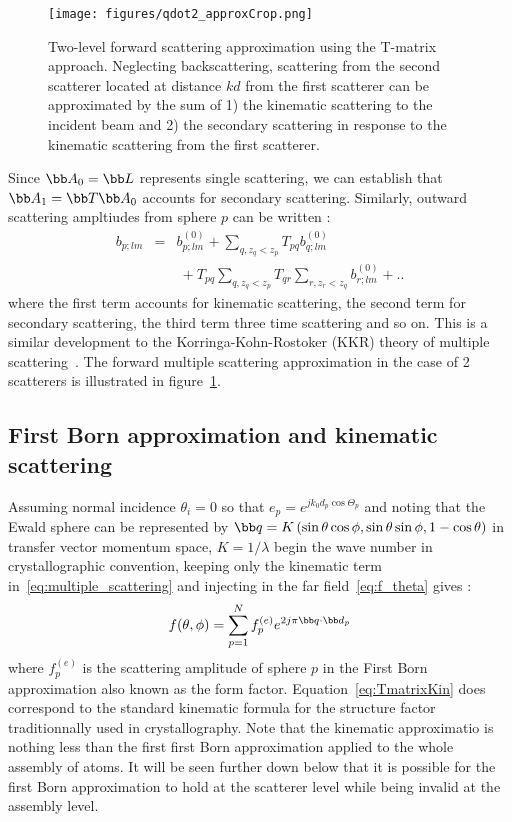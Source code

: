 \begin{figure}
  \centering
  \texttt{[image: figures/qdot2\_approxCrop.png]}
\caption{Two-level forward scattering approximation using the T-matrix approach.
Neglecting backscattering, scattering from the second scatterer located at
distance $kd$ from the first scatterer can be approximated by the sum of
1) the kinematic scattering to the incident beam and
2) the secondary scattering in response to the kinematic scattering from
the first scatterer. }\label{fig:qdot2_approx}
\end{figure}





Since $\bb A_0=\bb L$ represents single scattering, we can establish that
$\bb A_1=\bb T\bb A_0$ accounts for secondary scattering.
Similarly, outward scattering ampltiudes from sphere $p$ can be written :
%
\begin{eqnarray}
  b_{p;lm} &=&
      b_{p;lm}^{(0)} + \sum_{q,z_q<z_p}T_{pq}b_{q;lm}^{(0)}  \label{eq:multiple_scattering}\\
    &&~+T_{pq}\sum_{q,z_q<z_p}T_{qr}\sum_{r,z_r<z_q}b_{r;lm}^{(0)} + ..\nonumber
\end{eqnarray}
%
where the first term accounts for kinematic scattering, the second term for
secondary scattering, the third term three time scattering and so on.
This is a similar development to the Korringa-Kohn-Rostoker (KKR) theory of
multiple scattering~\cite{Korringa1947,Kohn1954,Korringa1994}.
The forward multiple scattering approximation in the case of 2 scatterers
is illustrated in figure~\ref{fig:qdot2_approx}.

\subsection{First Born approximation and kinematic scattering}
Assuming normal incidence $\theta_i=0$ so that $e_p=e^{jk_0d_p\cos\Theta_p}$
and noting that the Ewald sphere can be represented by
$\bb q = K\left(\sin\theta\cos\phi,\sin\theta\sin\phi,1-\cos\theta\right)$
in transfer vector momentum space,
$K=1/\lambda$ begin the wave number in crystallographic convention,
keeping only the kinematic term in~\eqref{eq:multiple_scattering}
and injecting in the far field~\eqref{eq:f_theta} gives :
%
\begin{equation}\label{eq:TmatrixKin}
  f(\theta,\phi) = \sum_{p=1}^{N}f_p^{(e)}e^{2j\pi \bb q\cdot \bb d_p}
\end{equation}
%
where $f_p^{(e)}$ is the scattering amplitude of sphere $p$ in the
First Born approximation also known as the form factor.
Equation~\eqref{eq:TmatrixKin} does correspond to the standard kinematic
formula for the structure factor traditionnally used in crystallography.
Note that the kinematic approximatio is nothing less than the first first Born
approximation applied to the whole assembly of atoms. It will be seen further
down below that it is possible for the first Born approximation to hold at the
scatterer level while being invalid at the assembly level.


